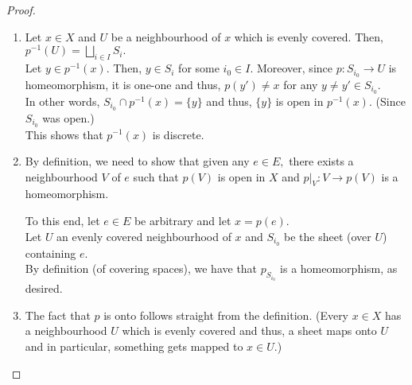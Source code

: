 \documentclass[12pt]{article}
\theoremstyle{definition}
\numberwithin{thm}{section}
\begin{document}
\begin{proof} 
	\phantom{hi}
	\begin{enumerate}
		\item Let $x \in X$ and $U$ be a neighbourhood of $x$ which is evenly covered. Then, $p^{-1}(U) = \displaystyle\bigsqcup_{i \in I} S_i.$\\
		Let $y \in p^{-1}(x).$ Then, $y \in S_i$ for some $i_0 \in I.$ Moreover, since $p:S_{i_0} \to U$ is homeomorphism, it is one-one and thus, $p(y') \neq x$ for any $y \neq y' \in S_{i_0}.$\\
		In other words, $S_{i_0} \cap p^{-1}(x) = \{y\}$ and thus, $\{y\}$ is open in $p^{-1}(x).$ (Since $S_{i_0}$ was open.)\\
		This shows that $p^{-1}(x)$ is discrete.
		\item By definition, we need to show that given any $e \in E,$ there exists a neighbourhood $V$ of $e$ such that $p(V)$ is open in $X$ and $p|_V:V \to p(V)$ is a homeomorphism.

		To this end, let $e \in E$ be arbitrary and let $x = p(e).$\\
		Let $U$ an evenly covered neighbourhood of $x$ and $S_{i_0}$ be the sheet (over $U$) containing $e.$\\
		By definition (of covering spaces), we have that $p_{S_{i_0}}$ is a homeomorphism, as desired.
		\item The fact that $p$ is onto follows straight from the definition. (Every $x \in X$ has a neighbourhood $U$ which is evenly covered and thus, a sheet maps onto $U$ and in particular, something gets mapped to $x \in U$.)


\end{enumerate}
\end{proof}
\end{document}
